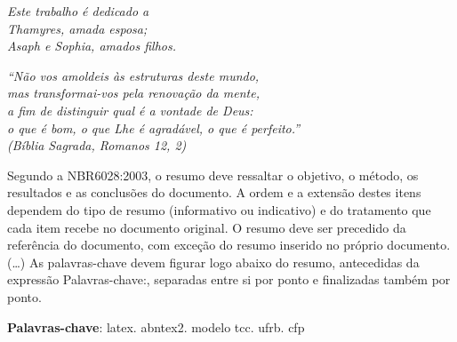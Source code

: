 \begin{dedicatoria}
  \vspace*{\fill}
  \centering
  \noindent
  \textit
  { 
    Este trabalho é dedicado a \\
    Thamyres, amada esposa; \\
    Asaph e Sophia, amados filhos.
  } 
  \vspace*{\fill}
\end{dedicatoria}


\begin{agradecimentos}
  \lipsum[1-3]    
\end{agradecimentos}


\begin{epigrafe}
  \vspace*{\fill}
  \begin{flushright}
    \textit
    {
      ``Não vos amoldeis às estruturas deste mundo, \\
      mas transformai-vos pela renovação da mente, \\
      a fim de distinguir qual é a vontade de Deus: \\
      o que é bom, o que Lhe é agradável, o que é perfeito.''\\
      (Bíblia Sagrada, Romanos 12, 2)
    }
  \end{flushright}
\end{epigrafe}


\setlength{\absparsep}{18pt} %
\begin{resumo}
 Segundo a NBR6028:2003, o resumo deve ressaltar o objetivo, o método, os 
 resultados e as conclusões do documento. 
 A ordem e a extensão destes itens dependem do tipo de resumo (informativo ou 
 indicativo) e do tratamento que cada item recebe no documento original. 
 O resumo deve ser precedido da referência do documento, com exceção do resumo 
 inserido no próprio documento. 
 (\ldots) As palavras-chave devem figurar logo abaixo do resumo, antecedidas da 
 expressão Palavras-chave:, separadas entre si por ponto e finalizadas também 
 por ponto.

 \textbf{Palavras-chave}: latex. abntex2. modelo tcc. ufrb. cfp
\end{resumo}

